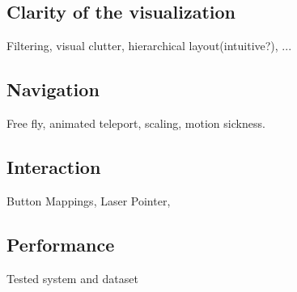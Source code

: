 \subsection{Clarity of the visualization}
Filtering, visual clutter, hierarchical layout(intuitive?), ...

\subsection{Navigation}
Free fly, animated teleport, scaling, motion sickness.

\subsection{Interaction}
Button Mappings, Laser Pointer, 

\subsection{Performance}
Tested system and dataset